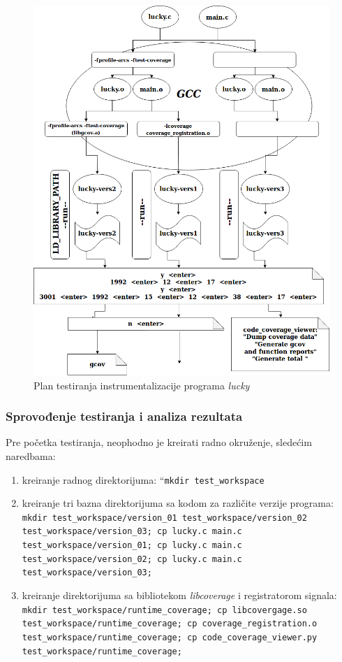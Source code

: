\documentclass[12pt,oneside]{memoir}
\newcommand{\kod}[1]{\texttt{#1}}
\newcommand{\strano}[1]{\textit{#1}}
\begin{document}
\begin{figure}[!ht]
  \centering
  \includegraphics[width=\textwidth]{img/lucky_diagram.png}
  \caption{Plan testiranja instrumentalizacije programa \strano{lucky}}
  \label{fig:diag}
\end{figure}

\subsubsection{Sprovođenje testiranja i analiza rezultata}

Pre početka testiranja, neophodno je kreirati radno okruženje, sledećim naredbama:
\begin{enumerate}
\item kreiranje radnog direktorijuma: “\kod{mkdir\ test\_workspace}
\item kreiranje tri bazna direktorijuma sa kodom za različite verzije programa:
\kod{mkdir test\_workspace/version\_01 test\_workspace/version\_02 test\_workspace/version\_03; cp lucky.c main.c test\_workspace/version\_01; cp lucky.c main.c test\_workspace/version\_02; cp lucky.c main.c test\_workspace/version\_03;}
\item kreiranje direktorijuma sa bibliotekom \strano{libcoverage} i registratorom signala:
\kod{mkdir test\_workspace/runtime\_coverage; cp libcovergage.so test\_workspace/runtime\_coverage; cp coverage\_registration.o test\_workspace/runtime\_coverage; cp code\_coverage\_viewer.py test\_workspace/runtime\_coverage;}
\end{enumerate}
\end{document}
